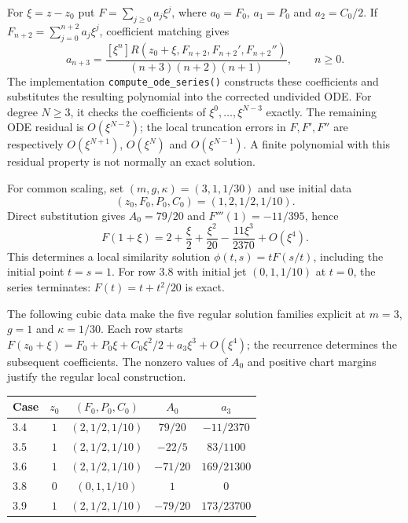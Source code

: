 \documentclass[12pt,a4paper,oneside]{report}
\numberwithin{equation}{chapter}
\begin{document}
For $\xi=z-z_0$ put $F=\sum_{j\geq0}a_j\xi^j$, where
$a_0=F_0$, $a_1=P_0$ and $a_2=C_0/2$. If
$F_{n+2}=\sum_{j=0}^{n+2}a_j\xi^j$, coefficient matching gives
\begin{equation}
 a_{n+3}=
 \frac{[\xi^n]R(z_0+\xi,F_{n+2},F_{n+2}',F_{n+2}'')}
 {(n+3)(n+2)(n+1)},\qquad n\geq0.
 \label{eq:sve-series-recurrence}
\end{equation}
The implementation \texttt{compute\_ode\_series()} constructs these
coefficients and substitutes the resulting polynomial into the corrected
undivided ODE. For degree $N\geq3$, it checks the coefficients of
$\xi^0,\ldots,\xi^{N-3}$ exactly. The remaining ODE residual is
$O(\xi^{N-2})$; the local truncation errors in $F,F',F''$ are respectively
$O(\xi^{N+1})$, $O(\xi^N)$ and $O(\xi^{N-1})$. A finite polynomial with
this residual property is not normally an exact solution.

For common scaling, set $(m,g,\kappa)=(3,1,1/30)$ and use initial data
\[
 (z_0,F_0,P_0,C_0)=(1,2,1/2,1/10).
\]
Direct substitution gives
$A_0=79/20$ and $F'''(1)=-11/395$, hence
\[
 F(1+\xi)=2+\frac{\xi}{2}+\frac{\xi^2}{20}
             -\frac{11\xi^3}{2370}+O(\xi^4).
\]
This determines a local similarity solution $\phi(t,s)=tF(s/t)$, including
the initial point $t=s=1$. For row 3.8 with initial jet $(0,1,1/10)$ at
$t=0$, the series terminates: $F(t)=t+t^2/20$ is exact.

The following cubic data make the five regular solution families explicit
at $m=3$, $g=1$ and $\kappa=1/30$. Each row starts
$F(z_0+\xi)=F_0+P_0\xi+C_0\xi^2/2+a_3\xi^3+O(\xi^4)$;
the recurrence determines the subsequent coefficients. The nonzero values
of $A_0$ and positive chart margins justify the regular local construction.
\begin{center}\small
\begin{tabular}{@{}lcccc@{}}
\toprule
Case & $z_0$ & $(F_0,P_0,C_0)$ & $A_0$ & $a_3$\\
\midrule
3.4 & $1$ & $(2,1/2,1/10)$ & $79/20$ & $-11/2370$\\
3.5 & $1$ & $(2,1/2,1/10)$ & $-22/5$ & $83/1100$\\
3.6 & $1$ & $(2,1/2,1/10)$ & $-71/20$ & $169/21300$\\
3.8 & $0$ & $(0,1,1/10)$ & $1$ & $0$\\
3.9 & $1$ & $(2,1/2,1/10)$ & $-79/20$ & $173/23700$\\
\bottomrule
\end{tabular}
\end{center}
\end{document}

